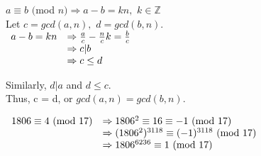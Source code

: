 \documentclass[a4paper, 11pt]{article}
\begin{document}
\begin{myEnumerate}
\begin{myEnumerate}
        \item
        $a \equiv b $ $ ($mod $n) \Rightarrow a - b = kn, $ $k \in \mathbb{Z}$ \\
        Let $c = gcd(a,n), $ $ d = gcd(b,n)$. \\
        \( \\
        \begin{array}{ll}
        	a - b = kn & \Rightarrow \frac{a}{c} - \frac{n}{c}k = \frac{b}{c} \\
            		   & \Rightarrow c|b \\
                       & \Rightarrow c \leq d
        \end{array} \\ \)
        
        Similarly, $d|a$ and $d \leq c$. \\
        Thus, c = d, or $gcd(a,n)=gcd(b,n)$. \\
        
        \item
        \( \\
        \begin{array}{ll}
        	1806 \equiv 4 $ (mod $17$)$ & \Rightarrow 1806^{2} \equiv 16 \equiv -1 $ (mod $17$)$ \\
            							  & \Rightarrow (1806^{2})^{3118} \equiv (-1)^{3118} $ (mod $17$)$ \\
                                          & \Rightarrow 1806^{6236} \equiv 1 $ (mod $17$)$
        \end{array} \)
        
    \end{myEnumerate}

\end{myEnumerate}
\end{document}
